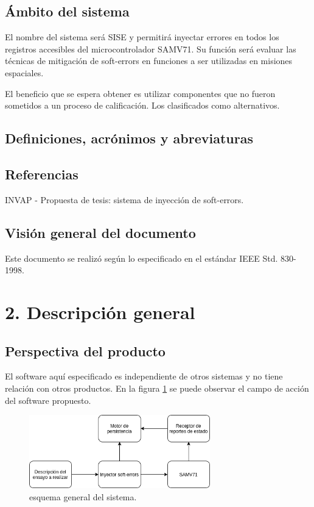 \documentclass[
11pt, %
codirector, %
]{charter}
\begin{document}
\subsection{Ámbito del sistema}

El nombre del sistema será SISE y permitirá inyectar errores en todos los registros accesibles del microcontrolador SAMV71. Su función será evaluar las técnicas de mitigación de soft-errors en funciones a ser utilizadas en misiones espaciales.

El beneficio que se espera obtener es utilizar componentes que no fueron sometidos a un proceso de calificación. Los clasificados como alternativos.

\subsection{Definiciones, acrónimos y abreviaturas}

\subsection{Referencias}

INVAP - Propuesta de tesis: sistema de inyección de soft-errors.

\subsection{Visión general del documento}

Este documento se realizó según lo especificado en el estándar IEEE Std. 830-1998.

\section{2. Descripción general}
\label{sec:descripcion}

\subsection{Perspectiva del producto}

El software aquí especificado es independiente de otros sistemas y no tiene relación con otros productos.
En la figura \ref{fig:esqGral} se puede observar el campo de acción del software propuesto.

\begin{figure}[h]
	\centering
	\includegraphics[width=0.7\textwidth]{./Figuras/SISE.png}
	\caption{esquema general del sistema.}
	\label{fig:esqGral}
\end{figure}
\end{document}
